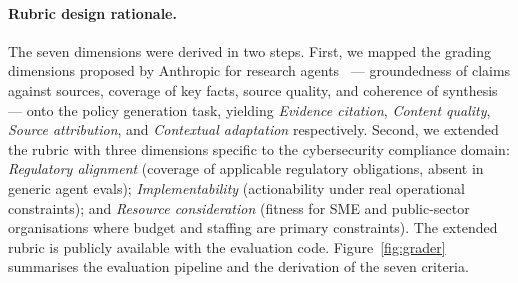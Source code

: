 \documentclass[runningheads]{llncs}
\begin{document}
\paragraph{Rubric design rationale.}
The seven dimensions were derived in two steps. First, we mapped the
grading dimensions proposed by Anthropic for research
agents~\cite{anthropic2024demystifying} — groundedness of claims against
sources, coverage of key facts, source quality, and coherence of synthesis
— onto the policy generation task, yielding \textit{Evidence citation},
\textit{Content quality}, \textit{Source attribution}, and
\textit{Contextual adaptation} respectively. Second, we extended the rubric
with three dimensions specific to the cybersecurity compliance domain:
\textit{Regulatory alignment} (coverage of applicable regulatory
obligations, absent in generic agent evals); \textit{Implementability}
(actionability under real operational constraints); and
\textit{Resource consideration} (fitness for SME and public-sector
organisations where budget and staffing are primary constraints). The
extended rubric is publicly available with the evaluation code.
Figure~\ref{fig:grader} summarises the evaluation pipeline and the
derivation of the seven criteria.
\end{document}
